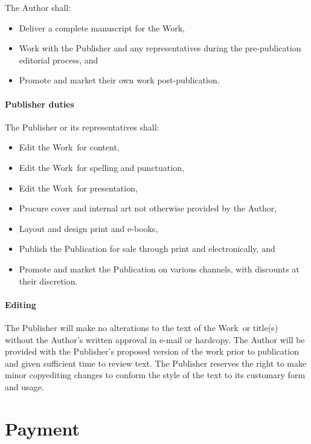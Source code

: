 \documentclass[12pt,letterpaper,oneside]{article}
\def\TheWork{the Work} %
\begin{document}
The Author shall:

\begin{itemize}
    \item Deliver a complete manuscript for \TheWork,
    \item Work with the Publisher and any representatives during the pre-publication editorial process, and
    \item Promote and market their own work post-publication.
\end{itemize}

\paragraph{Publisher duties}

The Publisher or its representatives shall:

\begin{itemize}
    \item Edit \TheWork\ for content,
    \item Edit \TheWork\ for spelling and punctuation,
    \item Edit \TheWork\ for presentation,
    \item Procure cover and internal art not otherwise provided by the Author,
    \item Layout and design print and e-books,
    \item Publish the Publication for sale through print and electronically, and
    \item Promote and market the Publication on various channels, with discounts at their discretion.
\end{itemize}

\paragraph{Editing}

The Publisher will make no alterations to the text of \TheWork\ or title(s) without the Author’s written approval in e-mail or hardcopy. The Author will be provided with the Publisher’s proposed version of the work prior to publication and given sufficient time to review text. The Publisher reserves the right to make minor copyediting changes to conform the style of the text to its customary form and usage.

\section{Payment}
\end{document}
